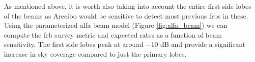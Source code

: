 \documentclass[a4paper,fleqn,usenatbib]{mnras}
\begin{document}
%
% 
% 
% 
% 

As mentioned above, it is worth also taking into account the entire
first side lobes of the beams as Arecibo would be sensitive to detect
most previous \glspl{frb} in these. Using the parameterized \gls{alfa}
beam model (Figure \ref{fig:alfa_beam}) \citep{GALFAbeam} we can
compute the \gls{frb} survey metric and expected rates as a function
of beam sensitivity.  The first side lobes peak at around $-10$ dB and
provide a significant increase in sky coverage compared to just the
primary lobes.
\end{document}
